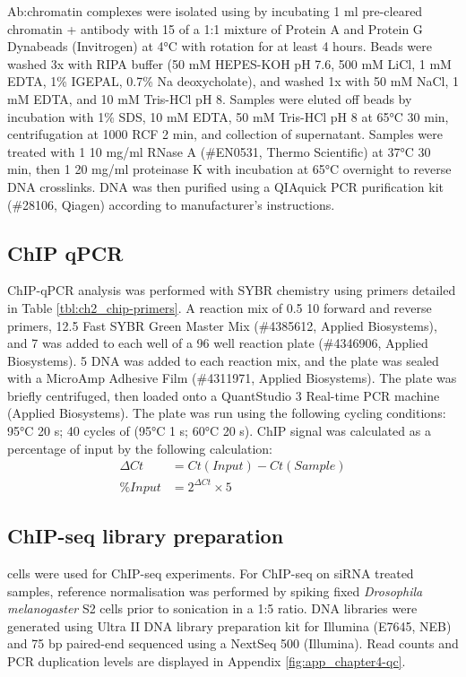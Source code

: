 Ab:chromatin complexes were isolated using by incubating 1 ml pre-cleared chromatin + antibody with 15 \microl{} of a 1:1 mixture of Protein A and Protein G Dynabeads (Invitrogen) at 4°C with rotation for at least 4 hours. Beads were washed 3x with RIPA buffer (50 mM HEPES-KOH pH 7.6, 500 mM LiCl, 1 mM EDTA, 1\% IGEPAL, 0.7\% Na deoxycholate), and washed 1x with 50 mM NaCl, 1 mM EDTA, and 10 mM Tris-HCl pH 8. Samples were eluted off beads by incubation with 1\% SDS, 10 mM EDTA, 50 mM Tris-HCl pH 8 at 65°C 30 min, centrifugation at 1000 RCF 2 min, and collection of supernatant. Samples were treated with 1 \microl{} 10 mg/ml RNase A (\#EN0531, Thermo Scientific) at 37°C 30 min, then 1 \microl{} 20 mg/ml proteinase K with incubation at 65°C overnight to reverse DNA crosslinks. DNA was then purified using a QIAquick PCR purification kit (\#28106, Qiagen) according to manufacturer's instructions.

\subsection{ChIP qPCR}

ChIP-qPCR analysis was performed with SYBR chemistry using primers detailed in Table \ref{tbl:ch2_chip-primers}. A reaction mix of 0.5 \microl{} 10 \microm{} forward and reverse primers, 12.5 \microl{} Fast SYBR Green Master Mix (\#4385612, Applied Biosystems), and 7 \microl{} \water{} was added to each well of a 96 well reaction plate (\#4346906, Applied Biosystems). 5 \microl{} DNA was added to each reaction mix, and the plate was sealed with a MicroAmp Adhesive Film (\#4311971, Applied Biosystems). The plate was briefly centrifuged, then loaded onto a QuantStudio 3 Real-time PCR machine (Applied Biosystems). The plate was run using the following cycling conditions: 95°C 20 s; 40 cycles of (95°C 1 s; 60°C 20 s). ChIP signal was calculated as a percentage of input by the following calculation: 
\begin{align*}
    \Delta{}Ct &= Ct(Input) - Ct(Sample) \\        
        \% Input &= 2^{\Delta{}Ct} \times 5
\end{align*}

\subsection{\label{ch2:chip-lib}ChIP-seq library preparation}

 cells were used for ChIP-seq experiments. For ChIP-seq on siRNA treated samples, reference normalisation was performed \citep{orlando_quantitative_2014} by spiking fixed \textit{Drosophila melanogaster} S2 cells prior to sonication in a 1:5 ratio. DNA libraries were generated using Ultra II DNA library preparation kit for Illumina (E7645, NEB) and 75 bp paired-end sequenced using a NextSeq 500 (Illumina). Read counts and PCR duplication levels are displayed in Appendix \ref{fig:app_chapter4-qc}.

